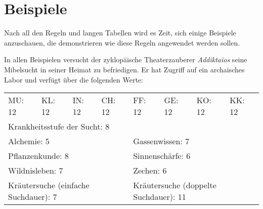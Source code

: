 \section{Beispiele}
Nach all den Regeln und langen Tabellen wird es Zeit, sich einige Beispiele anzuschauen, die demonstrieren wie diese Regeln angewendet werden sollen.

In allen Beispielen versucht der zyklopäische Theaterzauberer \emph{Addiktaïos} seine Mibelsucht in seiner Heimat zu befriedigen. Er hat Zugriff auf ein archaisches Labor und verfügt über die folgenden Werte:

\begin{center}
	\setlength{\tabcolsep}{11pt}
	\begin{tabular}{llllllll}
		\toprule
		MU: 12 & KL: 12 & IN: 12 & CH: 12 & FF: 12 & GE: 12 & KO: 12 & KK: 12 \\
		\cmidrule(lr){1-8}
		\multicolumn{8}{l}{Krankheitsstufe der Sucht: 8} \\
		\cmidrule(lr){1-8}
		\multicolumn{4}{l}{Alchemie: 5} & \multicolumn{4}{l}{Gassenwissen: 7} \\
		\multicolumn{4}{l}{Pflanzenkunde: 8} & \multicolumn{4}{l}{Sinnenschärfe: 6} \\
		\multicolumn{4}{l}{Wildnisleben: 7} & \multicolumn{4}{l}{Zechen: 6} \\
		\cmidrule(lr){1-8}
		\multicolumn{4}{l}{Kräutersuche (einfache Suchdauer): 7} & \multicolumn{4}{l}{Kräutersuche (doppelte Suchdauer): 11} \\
		\bottomrule
	\end{tabular}
\end{center}

